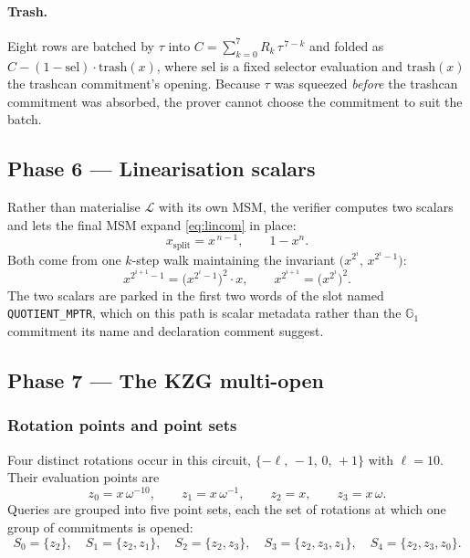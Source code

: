 \documentclass[11pt,a4paper]{article}
\newcommand{\Gone}{\ensuremath{\mathbb{G}_{1}}}
\newcommand{\mptr}[1]{\texttt{#1}}
\theoremstyle{definition}
\begin{document}
\paragraph{Trash.}
Eight rows are batched by $\tau$ into $C = \sum_{k=0}^{7} R_k\,\tau^{\,7-k}$
and folded as $C - (1-\mathrm{sel})\cdot \mathrm{trash}(x)$, where
$\mathrm{sel}$ is a fixed selector evaluation and $\mathrm{trash}(x)$ the
trashcan commitment's opening. Because $\tau$ was squeezed \emph{before} the
trashcan commitment was absorbed, the prover cannot choose the commitment to
suit the batch.

\subsection{Phase 6 --- Linearisation scalars}

Rather than materialise $\mathcal{L}$ with its own MSM, the verifier computes
two scalars and lets the final MSM expand \eqref{eq:lincom} in place:
\begin{equation}
x_{\mathrm{split}} = x^{\,n-1},
\qquad
1 - x^{n}.
\end{equation}
Both come from one $k$-step walk maintaining the invariant
$\big(x^{2^{i}},\,x^{2^{i}-1}\big)$:
\[
x^{2^{i+1}-1} = \big(x^{2^{i}-1}\big)^{2}\cdot x,
\qquad
x^{2^{i+1}} = \big(x^{2^{i}}\big)^{2}.
\]
The two scalars are parked in the first two words of the slot named
\mptr{QUOTIENT\_MPTR}, which on this path is scalar metadata rather than the
$\Gone$ commitment its name and declaration comment suggest.

\subsection{Phase 7 --- The KZG multi-open}
\label{sec:pcs}

\subsubsection{Rotation points and point sets}

Four distinct rotations occur in this circuit, $\{-\ell,\,-1,\,0,\,+1\}$ with
$\ell = 10$. Their evaluation points are
\begin{equation}
z_0 = x\,\omega^{-10},\qquad
z_1 = x\,\omega^{-1},\qquad
z_2 = x,\qquad
z_3 = x\,\omega .
\end{equation}
Queries are grouped into five point sets, each the set of rotations at which
one group of commitments is opened:
\begin{equation}
S_0=\{z_2\},\quad
S_1=\{z_2,z_1\},\quad
S_2=\{z_2,z_3\},\quad
S_3=\{z_2,z_3,z_1\},\quad
S_4=\{z_2,z_3,z_0\}.
\end{equation}
\end{document}
